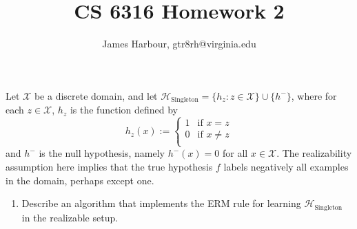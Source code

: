 \documentclass[12pt]{article}
\title{CS 6316 Homework 2}
\author{James Harbour, gtr8rh@virginia.edu}
\begin{document}
\maketitle


\begin{homeworkProblem}
  Let $ \mathcal{X} $ be a discrete domain, and let $ \mathcal{H}_{\text{Singleton}} = \{h_{z}:z\in \mathcal{X}\} \cup \{h^{-}\}$, where for each $ z\in \mathcal{X} $, $ h_{z} $ is the function defined by 
  \[
    h_{z}(x) := 
    \begin{cases} 
      1 & \text{if } x=z\\
      0 & \text{if } x\neq z\\
    \end{cases}
  \]
  and $ h^{-} $ is the null hypothesis, namely $ h^{-}(x)=0 $ for all $ x\in \mathcal{X} $. The realizability assumption here implies that the true hypothesis $ f $ labels negatively all examples in the domain, perhaps except one.
  \begin{enumerate}
    \item Describe an algorithm that implements the ERM rule for learning $ \mathcal{H}_{\text{Singleton}} $ in the realizable setup.
  \end{enumerate}
\end{homeworkProblem}
\end{document}
